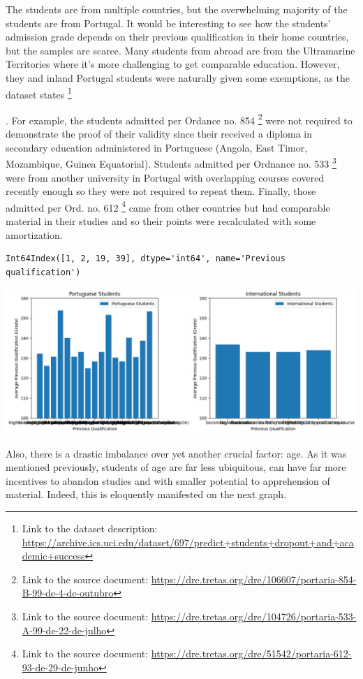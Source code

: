 \documentclass[
  letterpaper,
  DIV=11,
  numbers=noendperiod]{scrartcl}
\begin{document}
The students are from multiple countries, but the overwhelming majority
of the students are from Portugal. It would be interesting to see how
the students' admission grade depends on their previous qualification in
their home countries, but the samples are scarce. Many students from
abroad are from the Ultramarine Territories where it's more challenging
to get comparable education. However, they and inland Portugal students
were naturally given some exemptions, as the dataset states \footnote{Link
  to the dataset description:
  \url{https://archive.ics.uci.edu/dataset/697/predict+students+dropout+and+academic+success}}

. For example, the students admitted per Ordance no. 854 \footnote{Link
  to the source document:
  \url{https://dre.tretas.org/dre/106607/portaria-854-B-99-de-4-de-outubro}}
were not required to demonstrate the proof of their validity since their
received a diploma in secondary education administered in Portuguese
(Angola, East Timor, Mozambique, Guinea Equatorial). Students admitted
per Ordnance no. 533 \footnote{Link to the source document:
  \url{https://dre.tretas.org/dre/104726/portaria-533-A-99-de-22-de-julho}}
were from another university in Portugal with overlapping courses
covered recently enough so they were not required to repeat them.
Finally, those admitted per Ord. no. 612 \footnote{Link to the source
  document:
  \url{https://dre.tretas.org/dre/51542/portaria-612-93-de-29-de-junho}}
came from other countries but had comparable material in their studies
and so their points were recalculated with some amortization.

\begin{verbatim}
Int64Index([1, 2, 19, 39], dtype='int64', name='Previous qualification')
\end{verbatim}

\includegraphics{report_AzadhdhinNedalYunisAlFraijat_files/figure-pdf/cell-18-output-1.png}

Also, there is a drastic imbalance over yet another crucial factor: age.
As it was mentioned previously, students of age are far less ubiquitous,
can have far more incentives to abandon studies and with smaller
potential to apprehension of material. Indeed, this is eloquently
manifested on the next graph.
\end{document}
